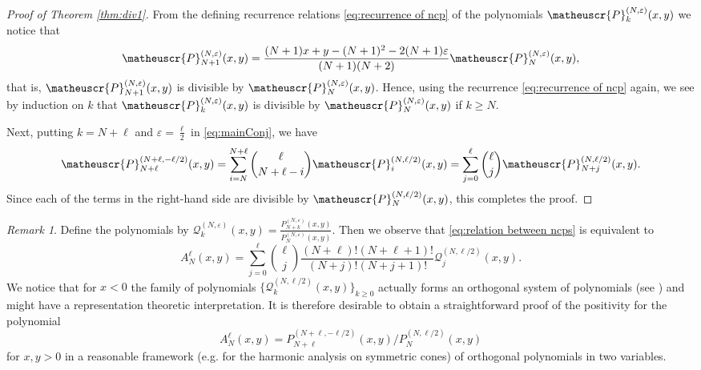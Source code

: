 \documentclass[11pt]{article}
\numberwithin{equation}{section}
\newcommand{\e}{\varepsilon}
\newcommand{\ncp}[2]{\matheuscr{P}^{(#1)}_{#2}} %
\theoremstyle{plain}
\theoremstyle{definition}
\theoremstyle{remark}
\newtheorem{rem}{Remark}[section]
\begin{document}
\begin{proof}[Proof of Theorem \ref{thm:div1}]
  From the defining recurrence relations \eqref{eq:recurrence of ncp} of the
  polynomials \(\ncp{N,\e}{k}(x,y)\) we notice that
  \begin{equation*}
    \ncp{N,\e}{N+1}(x,y)=\frac{(N+1)x+y-(N+1)^2-2(N+1)\e}{(N+1)(N+2)}\ncp{N,\e}N(x,y),
  \end{equation*}
  that is, $\ncp{N,\e}{N+1}(x,y)$ is divisible by $\ncp{N,\e}N(x,y)$.
  Hence, using the recurrence \eqref{eq:recurrence of ncp} again,
  we see by induction on $k$ that $\ncp{N,\e}k(x,y)$ is divisible by $\ncp{N,\e}N(x,y)$ if $k\ge N$.

  Next, putting $k=N+\ell$ and $\e=\frac{\ell}{2}$ in \eqref{eq:mainConj}, we have
  \begin{equation}\label{eq:relation between ncps}
    \ncp{N+\ell,-\ell/2}{N+\ell}(x,y)
    =\sum_{i=N}^{N+\ell}\binom{\ell}{N+\ell-i} \ncp{N,\ell/2}i(x,y)
    =\sum_{j=0}^{\ell}\binom{\ell}{j} \ncp{N,\ell/2}{N+j}(x,y).
  \end{equation}
  Since each of the terms in the right-hand side are divisible by $\ncp{N,\ell/2}N(x,y)$,
  this completes the proof. 
\end{proof}

\begin{rem}
Define the polynomials by
$\mathcal{Q}_k^{(N,\e)}(x,y) = \frac{P_{N+k}^{(N,\e)}(x,y)}{P_{N}^{(N,\e)}(x,y)}$.
Then we observe that \eqref{eq:relation between ncps} is equivalent to
\begin{equation}\label{eq:polyAnpolysum}
A_N^\ell(x,y) = \sum_{j=0}^\ell \binom{\ell}{j} \frac{(N+\ell)!(N+\ell+1)!}{(N+j)!(N+j+1)!} \mathcal{Q}_{j}^{(N,\ell/2)}(x,y).
\end{equation}
We notice that for $x<0$ the family of polynomials $\{\mathcal{Q}_k^{(N,\ell/2)}(x,y)\}_{k \geq 0}$ actually forms
an orthogonal system of polynomials (see \cite{C1978}) and
might have a representation theoretic interpretation.
It is therefore desirable to obtain a straightforward  proof of the positivity for the polynomial
\[
  A_N^{\ell}(x,y)= P_{N+\ell}^{(N+\ell,-\ell/2)}(x,y)/P_N^{(N,\ell/2)}(x,y)
\]
for $x, y>0$
in a reasonable framework
(e.g. \cite{FK1994} for the harmonic analysis on symmetric cones) of orthogonal polynomials in two variables.
\end{rem}


\end{document}
